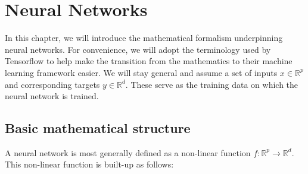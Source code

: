 \section{Neural Networks}\label{sec:neural_networks}
In this chapter, we will introduce the mathematical formalism underpinning
neural networks. For convenience, we will adopt the terminology used by Tensorflow\cite{tf} 
to help make the transition from the mathematics to their machine learning framework easier.
We will stay general and assume a set of inputs $x \in \mathbb{R}^p$ and corresponding targets $y \in \mathbb{R}^d$. 
These serve as the training data on which the neural network is trained.

\subsection{Basic mathematical structure}
A neural network is most generally defined as a non-linear function $f : \mathbb{R}^p \to \mathbb{R}^d$.
This non-linear function is built-up as follows:
